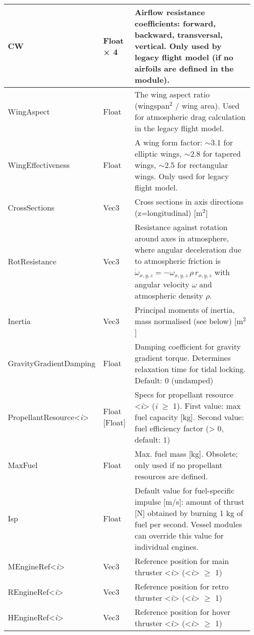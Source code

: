 \documentclass[Orbiter Developer Manual.tex]{subfiles}
\begin{document}
\begin{longtable}{ |p{}|p{}|p{}| }
	\hline\rule{0pt}{2ex}
	CW & Float × 4 & Airflow resistance coefficients: forward, backward, transversal, vertical. Only used by legacy flight model (if no airfoils are defined in the module).\\
	\hline\rule{0pt}{2ex}
	WingAspect & Float & The wing aspect ratio (wingspan$^{2}$ / wing area). Used for atmospheric drag calculation in the legacy flight model.\\
	\hline\rule{0pt}{2ex}
	WingEffectiveness & Float & A wing form factor: $\sim$3.1 for elliptic wings, $\sim$2.8 for tapered wings, $\sim$2.5 for rectangular wings. Only used for legacy flight model.\\
	\hline\rule{0pt}{2ex}
	CrossSections & Vec3 & Cross sections in axis directions (z=longitudinal) [m$^{2}$]\\
	\hline\rule{0pt}{2ex}
	RotResistance & Vec3 & Resistance against rotation around axes in atmosphere, where angular deceleration due to atmospheric friction is $\dot{\omega}_{x,y,z} = -\omega_{x,y,z} \, \rho \, r_{x,y,z}$ with angular velocity $\omega$ and atmospheric density $\rho$.\\
	\hline\rule{0pt}{2ex}
	Inertia & Vec3 & Principal moments of inertia, mass normalised (see below) [m$^{2}$]\\
	\hline\rule{0pt}{2ex}
	GravityGradientDamping & Float & Damping coefficient for gravity gradient torque. Determines relaxation time for tidal locking. Default: 0 (undamped)\\
	\hline\rule{0pt}{2ex}
	PropellantResource<\textit{i}> & Float [Float] & Specs for propellant resource <\textit{i}> (\textit{i} $\geq$ 1). First value: max fuel capacity [kg]. Second value: fuel efficiency factor (> 0, default: 1)\\
	\hline\rule{0pt}{2ex}
	MaxFuel & Float & Max. fuel mass [kg]. Obsolete; only used if no propellant resources are defined.\\
	\hline\rule{0pt}{2ex}
	Isp & Float & Default value for fuel-specific impulse [m/s]: amount of thrust [N] obtained by burning 1 kg of fuel per second. Vessel modules can override this value for individual engines.\\
	\hline\rule{0pt}{2ex}
	MEngineRef<\textit{i}> & Vec3 & Reference position for main thruster <\textit{i}> (<\textit{i}> $\geq$ 1)\\
	\hline\rule{0pt}{2ex}
	REngineRef<\textit{i}> & Vec3 & Reference position for retro thruster <\textit{i}> (<\textit{i}> $\geq$ 1)\\
	\hline\rule{0pt}{2ex}
	HEngineRef<\textit{i}> & Vec3 & Reference position for hover thruster <\textit{i}> (<\textit{i}> $\geq$ 1)\\

\end{longtable}
\end{document}

